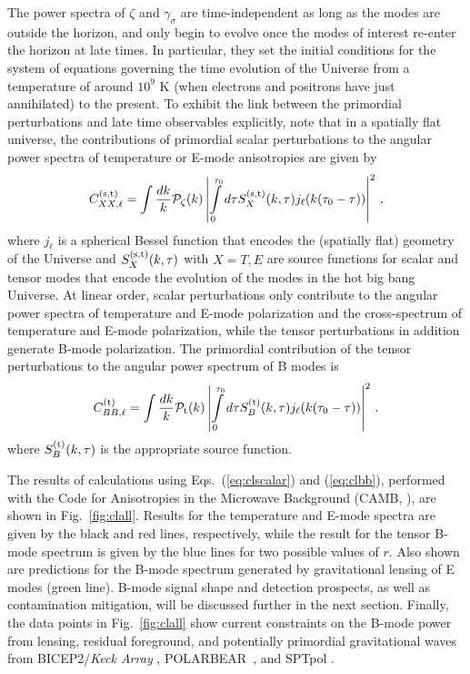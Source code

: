 The power spectra of $\zeta$ and $\gamma_\sigma$ are time-independent as long as the modes are outside the horizon, and only begin to evolve once the modes of interest re-enter the horizon at late times. In particular, they set the initial conditions for the system of equations governing the time evolution of the Universe from a temperature of around $10^9$ K (when electrons and positrons have just annihilated) to the present. To exhibit the link between the primordial perturbations and late time observables explicitly, note that in a spatially flat universe, the contributions of primordial scalar perturbations to the angular power spectra of temperature or E-mode anisotropies are given by
\begin{equation}
C^{({\rm s,t})}_{XX,\ell}=\int \frac{dk}{k}\mathcal{P}_\zeta(k)\left|\int\limits_0^{\tau_0} d\tau S_X^{({\rm s,t})}(k,\tau)j_\ell(k(\tau_0-\tau))\right|^2\,,
\label{eq:clscalar}
\end{equation}
where $j_\ell$ is a spherical Bessel function that encodes the (spatially flat) geometry of the Universe and $S_X^{({\rm s,t})}(k,\tau)$ with $X=T,E$ are source functions for scalar and tensor modes that encode the evolution of the modes in the hot big bang Universe.
At linear order, scalar perturbations only contribute to the angular power spectra of temperature and E-mode polarization and the cross-spectrum of temperature and E-mode polarization, while the tensor perturbations in addition generate B-mode polarization. The primordial contribution of the tensor perturbations to the angular power spectrum of B modes is 
\begin{equation}
C^{({\rm t})}_{BB,\ell}=\int \frac{dk}{k}\mathcal{P}_{\rm t}(k)\left|\int\limits_0^{\tau_0} d\tau S_B^{({\rm t})}(k,\tau)j_\ell(k(\tau_0-\tau))\right|^2\,.
\label{eq:clbb}
\end{equation}
where $S_B^{({\rm t})}(k,\tau)$ is the appropriate source function. 

The results of calculations using Eqs.~(\ref{eq:clscalar}) and (\ref{eq:clbb}), performed with the Code for Anisotropies in the Microwave Background (CAMB, \cite{Lewis:1999bs}), are shown in Fig.~\ref{fig:clall}. Results for the temperature and E-mode spectra are given by the black and red lines, respectively, while the result for the tensor B-mode spectrum is given by the blue lines for two possible values of $r$. Also shown are predictions for the B-mode spectrum generated by gravitational lensing of E modes (green line). B-mode signal shape and detection prospects, as well as contamination mitigation, will be discussed further in the next section.  Finally, the data points in Fig.~\ref{fig:clall} show current constraints on the B-mode power from lensing, residual foreground, and potentially primordial gravitational waves from { BICEP}2/{\it Keck Array} \cite{Ade:2015fwj}, POLARBEAR~\cite{Ade:2014afa}, and SPTpol \cite{Keisler:2015hfa}.

